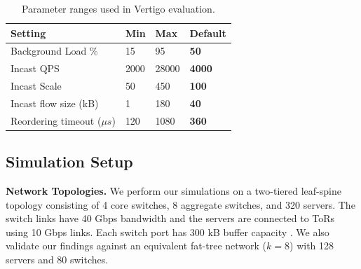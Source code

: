 \begin{table}[t]
\centering
\small{

\begin{tabular}{l||l|l|l}
Setting                 & Min & Max  & Default \\ \hline \hline
Background Load \% \cite{hpcc, dibs, timely}     & 15  & 95   & \textbf{50}      \\
Incast QPS \cite{dibs}             & 2000  & 28000 & \textbf{4000}     \\
Incast Scale \cite{dibs, tlt}           & 50  & 450  & \textbf{100}      \\
Incast flow size (kB) \cite{dibs}  & 1   & 180  & \textbf{40}      \\
Reordering timeout ($\mu s$) & 120 & 1080 & \textbf{360}  
\end{tabular}
\caption{\small{Parameter ranges used in Vertigo evaluation.}}
\label{tab:param}
\vspace{-0.6cm}
}
\end{table}

\subsection{Simulation Setup}
\label{sec:setup}
\textbf{Network Topologies.} We perform our simulations on a two-tiered leaf-spine topology consisting of 4 core switches, 8 aggregate switches, and 320 servers. The switch links have 40 Gbps bandwidth and the servers are connected to ToRs using 10 Gbps links. Each switch port has 300 kB buffer capacity \cite{dibs, ecnmultiqueue}. We also validate our findings against an equivalent fat-tree \cite{fattree} network ($k=8$) with 128 servers and 80 switches.

